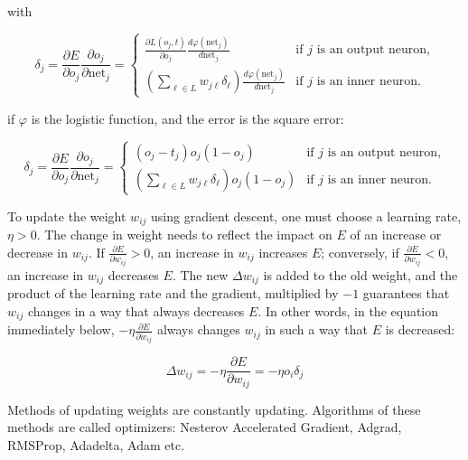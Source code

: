 with

\begin{equation}
    \label{eq:chain-11}
    \delta _{j}={\frac {\partial E}{\partial o_{j}}}{\frac {\partial o_{j}}{\partial {\text{net}}_{j}}}={\begin{cases}{\frac {\partial L(o_{j},t)}{\partial o_{j}}}{\frac {d\varphi ({\text{net}}_{j})}{d{\text{net}}_{j}}}&{\text{if }}j{\text{ is an output neuron,}}\\(\sum _{\ell \in L}w_{j\ell }\delta _{\ell }){\frac {d\varphi ({\text{net}}_{j})}{d{\text{net}}_{j}}}&{\text{if }}j{\text{ is an inner neuron.}}\end{cases}}
\end{equation}

if $\varphi$  is the logistic function, and the error is the square error:

\begin{equation}
    \label{eq:chain-12}
    \delta _{j}={\frac {\partial E}{\partial o_{j}}}{\frac {\partial o_{j}}{\partial {\text{net}}_{j}}}={\begin{cases}(o_{j}-t_{j})o_{j}(1-o_{j})&{\text{if }}j{\text{ is an output neuron,}}\\(\sum _{\ell \in L}w_{j\ell }\delta _{\ell })o_{j}(1-o_{j})&{\text{if }}j{\text{ is an inner neuron.}}\end{cases}}
\end{equation}

To update the weight $w_{ij}$ using gradient descent, one must choose a learning rate, $\eta >0$. The change in weight needs to reflect the impact on $E$ of an increase or decrease in $w_{ij}$. If ${\frac {\partial E}{\partial w_{ij}}}>0$, an increase in $w_{ij}$ increases $E$; conversely, if ${\frac {\partial E}{\partial w_{ij}}}<0$, an increase in $w_{ij}$ decreases $E$. The new $\Delta w_{ij}$ is added to the old weight, and the product of the learning rate and the gradient, multiplied by $-1$ guarantees that $w_{ij}$ changes in a way that always decreases $E$. In other words, in the equation immediately below, $-\eta {\frac {\partial E}{\partial w_{ij}}}$ always changes $w_{ij}$ in such a way that $E$ is decreased:

\begin{equation}
    \label{eq:chain-13}
    \Delta w_{ij}=-\eta {\frac {\partial E}{\partial w_{ij}}}=-\eta o_{i}\delta _{j}
\end{equation}

Methods of updating weights are constantly updating. Algorithms of these methods are called optimizers: Nesterov Accelerated Gradient, Adgrad, RMSProp, Adadelta, Adam etc.

